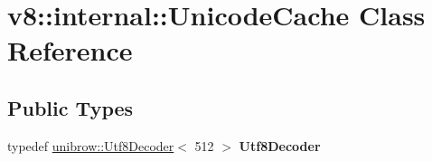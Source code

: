\hypertarget{classv8_1_1internal_1_1_unicode_cache}{}\section{v8\+:\+:internal\+:\+:Unicode\+Cache Class Reference}
\label{classv8_1_1internal_1_1_unicode_cache}
\subsection*{Public Types}
\begin{DoxyCompactItemize}
\item 
typedef \hyperlink{classunibrow_1_1_utf8_decoder}{unibrow\+::\+Utf8\+Decoder}$<$ 512 $>$ {\bfseries Utf8\+Decoder}\hypertarget{classv8_1_1internal_1_1_unicode_cache_a23782170a48d31306dacf9ea0596bf05}{}\label{classv8_1_1internal_1_1_unicode_cache_a23782170a48d31306dacf9ea0596bf05}

\end{DoxyCompactItemize}
